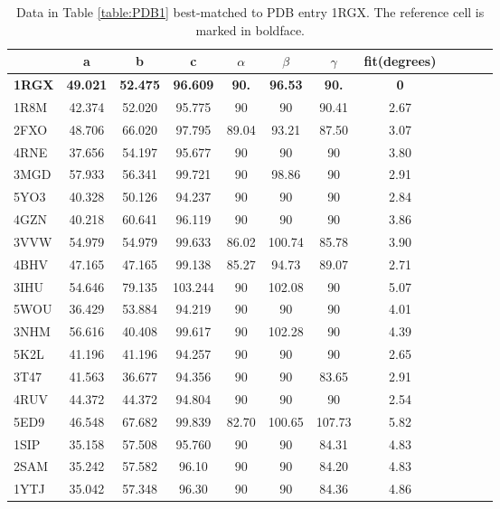 \documentclass[preprint]{iucr}              %
\numberwithin{equation}{section}
\numberwithin{equation}{section}
\begin{document}
	
	\begin{table}
		\begin{center}
			\caption{Data in Table \ref{table:PDB1} best-matched to PDB entry 1RGX.  The 
				reference cell is marked in boldface.}
			\vspace{3mm}
			\begin{tabular}{lccccccccccc} \toprule
				\rotatebox{0}{PDB}&  a&b&c&$\alpha$&$\beta$&$\gamma$ & fit(degrees)\\ \midrule
				
				\textbf{1RGX}  &\textbf{49.021} &\textbf{52.475}
				&\textbf{96.609}   &\textbf{90.}  &\textbf{96.53}   &\textbf{90.}   &\textbf{0} \\ 
				
1R8M & 42.374 & 52.020 & 95.775 & 90 & 90 & 90.41 & 2.67 \\
2FXO & 48.706 & 66.020 & 97.795 & 89.04 & 93.21 & 87.50 & 3.07 \\
4RNE & 37.656 & 54.197 & 95.677 & 90 & 90 & 90 & 3.80 \\
3MGD & 57.933 & 56.341 & 99.721 & 90 & 98.86 & 90 & 2.91 \\
5YO3 & 40.328 & 50.126 & 94.237 & 90 & 90 & 90 & 2.84 \\
4GZN & 40.218 & 60.641 & 96.119 & 90 & 90 & 90 & 3.86 \\
3VVW & 54.979 & 54.979 & 99.633 & 86.02 & 100.74 & 85.78 & 3.90  \\
4BHV & 47.165 & 47.165 & 99.138 & 85.27 & 94.73 & 89.07 & 2.71 \\
3IHU & 54.646 & 79.135 & 103.244 & 90 & 102.08 & 90 & 5.07   \\
5WOU & 36.429 & 53.884 & 94.219 & 90 & 90 & 90 & 4.01 \\
3NHM & 56.616 & 40.408 & 99.617 & 90 & 102.28 & 90 & 4.39  \\
5K2L & 41.196 & 41.196 & 94.257 & 90 & 90 & 90 & 2.65 \\
3T47 & 41.563 & 36.677 & 94.356 & 90 & 90 & 83.65 & 2.91 \\
4RUV & 44.372 & 44.372 & 94.804 & 90 & 90 & 90 & 2.54 \\
5ED9 & 46.548 & 67.682 & 99.839 & 82.70 & 100.65  & 107.73 & 5.82   \\
1SIP & 35.158 & 57.508 & 95.760 & 90 & 90 & 84.31 & 4.83 \\
2SAM & 35.242 & 57.582 & 96.10 & 90 & 90 & 84.20 & 4.83 \\
1YTJ & 35.042 & 57.348 & 96.30 & 90 & 90 & 84.36 & 4.86 \\

\end{tabular}
\end{center}
\end{table}
\end{document}
